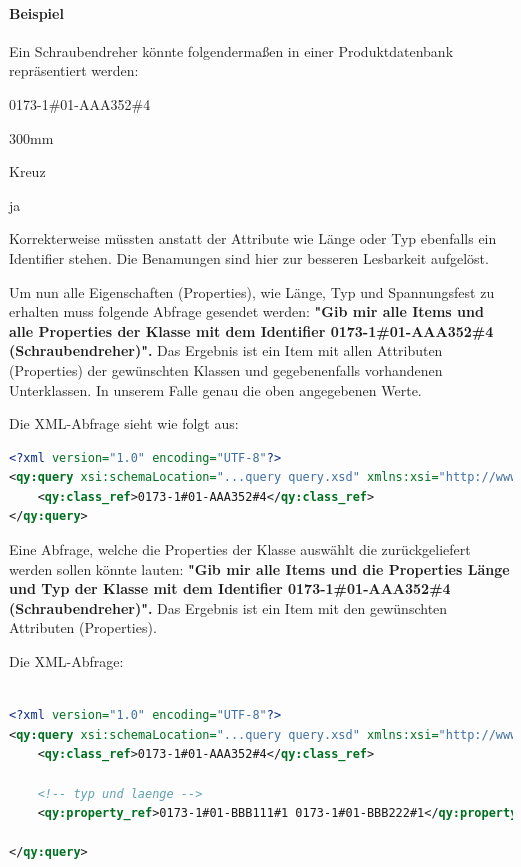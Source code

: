 \paragraph{Beispiel}

Ein Schraubendreher könnte folgendermaßen in einer Produktdatenbank repräsentiert werden:

\begin{description}\label{lab:schraubendreher}
\item[Klassen-Identifier] 0173-1\#01-AAA352\#4 
\item[Länge] 300mm
\item[Typ] Kreuz
\item[Spannungsfest] ja
\end{description}

Korrekterweise müssten anstatt der Attribute wie Länge oder Typ ebenfalls ein Identifier stehen. Die Benamungen sind hier zur besseren Lesbarkeit aufgelöst. 

Um nun alle Eigenschaften (Properties), wie Länge, Typ und Spannungsfest zu erhalten muss folgende Abfrage gesendet werden: 
\textbf{"Gib mir alle Items und alle Properties der Klasse mit dem Identifier 0173-1\#01-AAA352\#4 (Schraubendreher)".}
Das Ergebnis ist ein Item mit allen Attributen (Properties) der gewünschten Klassen und gegebenenfalls vorhandenen Unterklassen. In unserem Falle genau die oben angegebenen Werte.

Die XML-Abfrage sieht wie folgt aus:

\begin{lstlisting}[caption=Query Beispiel - Daten abfragen, language=XML, label=UseCaseDatenabfragen]
<?xml version="1.0" encoding="UTF-8"?>
<qy:query xsi:schemaLocation="...query query.xsd" xmlns:xsi="http://www.w3.org/2001/XMLSchema-instance" xmlns:cat="...catalogue" xmlns:val="...value" xmlns:qy="...query" xmlns:bas="...basic">
	<qy:class_ref>0173-1#01-AAA352#4</qy:class_ref>
</qy:query>
\end{lstlisting}

Eine Abfrage, welche die Properties der Klasse auswählt die zurückgeliefert werden sollen könnte lauten: 
\textbf{"Gib mir alle Items und die Properties Länge und Typ der Klasse mit dem Identifier 0173-1\#01-AAA352\#4 (Schraubendreher)".}
Das Ergebnis ist ein Item mit den gewünschten Attributen (Properties). 

Die XML-Abfrage:
\begin{lstlisting}[caption=Query Beispiel - Daten abfragen mit Propertyeinschränkung, language=XML, label=lst:UseCaseDatenabfragenProperty]

<?xml version="1.0" encoding="UTF-8"?>
<qy:query xsi:schemaLocation="...query query.xsd" xmlns:xsi="http://www.w3.org/2001/XMLSchema-instance" xmlns:cat="...catalogue" xmlns:val="...value" xmlns:qy="...query" xmlns:bas="...basic">
	<qy:class_ref>0173-1#01-AAA352#4</qy:class_ref>
	
	<!-- typ und laenge -->
	<qy:property_ref>0173-1#01-BBB111#1 0173-1#01-BBB222#1</qy:property_ref> 
	
</qy:query>
\end{lstlisting}


